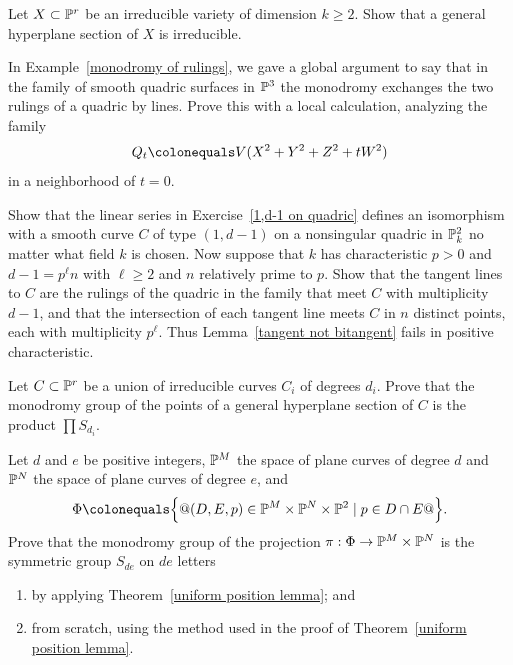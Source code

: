 \begin{exercise}
Let $X \subset \PP^r$ be an irreducible variety of dimension $k \geq 2$.
Show that a general hyperplane section of $X$ is irreducible.
\end{exercise}

\begin{exercise}
In Example~\ref{monodromy of rulings}, we gave a global argument to say
that in the family of smooth quadric surfaces in $\PP^3$ the monodromy
exchanges the two rulings of a quadric by lines. Prove this with a local
calculation, analyzing the family
$$
Q_t \colonequals  V(X^2+Y^2+Z^2 + tW^2)
$$
in a neighborhood of $t=0$.
\end{exercise}

\begin{exercise}
\label{kaji}
Show that the linear series
in Exercise~\ref{1,d-1 on quadric}
%
defines an isomorphism with a smooth curve $C$ of type $(1, d-1)$ on a
nonsingular quadric in $\PP^2_k$ no matter what field $k$ is chosen. Now
suppose that  $k$ has characteristic $p>0$ and $d-1 = p^\ell n$ with
$\ell\ge 2$
and $n$ relatively prime to $p$.
Show that the tangent lines to $C$ are the rulings of the quadric in the
family that meet $C$ with multiplicity $d-1$, and that the intersection of
each tangent line meets $C$ in $n$ distinct points, each with multiplicity
$p^\ell$. Thus Lemma~\ref{tangent not bitangent}
fails in
positive characteristic.
%
\end{exercise}

\begin{exercise}
Let $C \subset \PP^r$ be a union of irreducible curves $C_i$ of degrees
$d_i$. Prove that the monodromy group of the points of a general
hyperplane section of $C$ is the product $\prod S_{d_i}$.
\end{exercise}

\begin{exercise}
Let $d$ and $e$ be positive integers, $\PP^M$ the space of plane curves
of degree $d$ and $\PP^N$ the space of plane curves of degree $e$, and
$$
\Phi \colonequals  \big\{@ (D, E, p) \in \PP^M \times \PP^N \times \PP^2 \mid
p \in D \cap E@\big \}.
$$
Prove that the monodromy group of the projection $\pi : \Phi \to \PP^M
\times \PP^N$ is the symmetric group $S_{de}$ on $de$ letters
\begin{enumerate}
\item by applying Theorem~\ref{uniform position lemma}; and
\item from scratch, using the method used in the proof of
Theorem~\ref{uniform position lemma}.
\end{enumerate}\label{tnih11.5}
\end{exercise}

